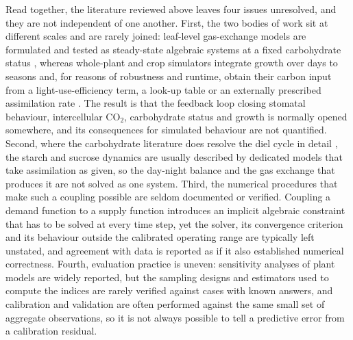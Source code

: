 \documentclass[a4paper,fleqn]{cas-sc}
\begin{document}
Read together, the literature reviewed above leaves four issues unresolved, and they are not independent of one another. First, the two bodies of work sit at different scales and are rarely joined: leaf-level gas-exchange models are formulated and tested as steady-state algebraic systems at a fixed carbohydrate status \cite{Farquhar1980,Jarvis1976,vonCaemmerer2000}, whereas whole-plant and crop simulators integrate growth over days to seasons and, for reasons of robustness and runtime, obtain their carbon input from a light-use-efficiency term, a look-up table or an externally prescribed assimilation rate \cite{Jones2003,deWit2019,Holzworth2014}. The result is that the feedback loop closing stomatal behaviour, intercellular CO$_2$, carbohydrate status and growth is normally opened somewhere, and its consequences for simulated behaviour are not quantified. Second, where the carbohydrate literature does resolve the diel cycle in detail \cite{Scialdone2013,Graf2010,Stitt2012}, the starch and sucrose dynamics are usually described by dedicated models that take assimilation as given, so the day-night balance and the gas exchange that produces it are not solved as one system. Third, the numerical procedures that make such a coupling possible are seldom documented or verified. Coupling a demand function to a supply function introduces an implicit algebraic constraint that has to be solved at every time step, yet the solver, its convergence criterion and its behaviour outside the calibrated operating range are typically left unstated, and agreement with data is reported as if it also established numerical correctness. Fourth, evaluation practice is uneven: sensitivity analyses of plant models are widely reported, but the sampling designs and estimators used to compute the indices are rarely verified against cases with known answers, and calibration and validation are often performed against the same small set of aggregate observations, so it is not always possible to tell a predictive error from a calibration residual.
\end{document}

